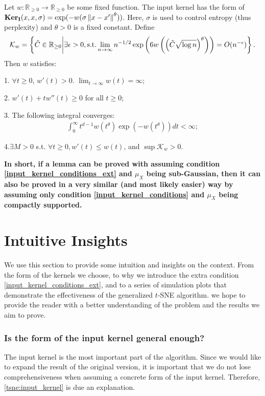 \begin{condition} \label{input_kernel_conditions_ext}
    Let $w: \mathbb{R}_{\geq 0} \to \mathbb{R}_{\geq 0}$ be some fixed function. The input kernel has the form of $\mathbf{Ker}_{\mathbf{I}}(x,x,\sigma) = \exp(-w(\sigma\left\lVert x-x'\right\rVert^{\theta}))$. Here, $\sigma$ is used to control entropy (thus perplexity) and $\theta>0$ is a fixed constant. Define
    \begin{align} \label{tsne:kw_def}
        \mathcal{K}_w = \left\{\tilde{C} \in \mathbb{R}_{\geq 0} \bigg\rvert \exists \epsilon>0, \text{\normalfont s.t.} \lim_{n \to \infty} n^{-1/2} \exp \left(6 w\left(\left(\tilde{C} \sqrt{\log n} \right)^{\theta} \right) \right) = O(n^{-\epsilon}) \right\}.
    \end{align}
    Then $w$ satisfies:

    1. $\forall t \geq 0$, $w'(t)>0$. $\lim_{t \to \infty} w(t) = \infty$;

    2. $w'(t)+tw''(t) \geq 0$ for all $t \geq 0$;

    3. The following integral converges:
    \begin{align}
        \int_0^{\infty} t^{d-1} w(t^{\theta}) \exp(-w(t^{\theta}))dt < \infty;
    \end{align}

    4.$\exists M > 0$ s.t. $\forall t \geq 0, w'(t) \leq w(t)$, and $\sup \mathcal{K}_w > 0$.
\end{condition}
\textbf{In short, if a lemma can be proved with assuming condition \ref{input_kernel_conditions_ext} and $\mu_X$ being sub-Gaussian, then it can also be proved in a very similar (and most likely easier) way by assuming only condition \ref{input_kernel_conditions} and $\mu_X$ being compactly supported.}
\section{Intuitive Insights} \label{tsne:sec:intuition}
We use this section to provide some intuition and insights on the context. From
the form of the kernels we choose, to why we introduce the extra condition
\ref{input_kernel_conditions_ext}, and to a series of simulation plots that
demonstrate the effectiveness of the generalized $t$-SNE algorithm. we hope to
provide the reader with a better understanding of the problem and the results
we aim to prove.

\subsubsection*{Is the form of the input kernel general
    enough?} The input kernel is the most important part of the algorithm.
Since we would like to expand the result of the original version, it is
important that we do not lose comprehensiveness when assuming a concrete form
of the input kernel. Therefore, \eqref{tsne:input_kernel} is due an
explanation.

